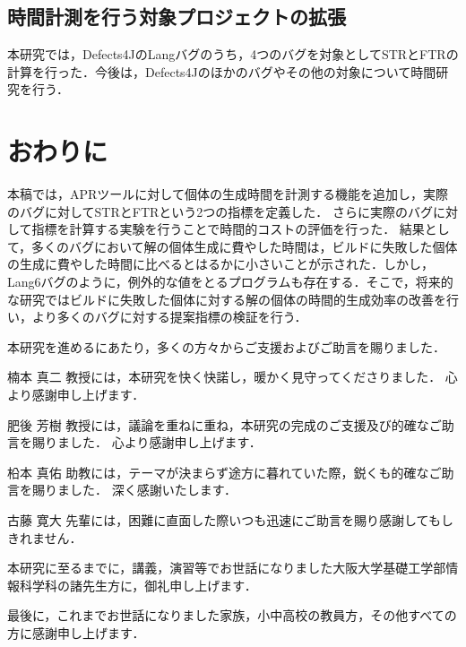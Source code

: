 \documentclass[uplatex,dvipdfmx,a4paper]{jsarticle}
\begin{document}
\subsection{時間計測を行う対象プロジェクトの拡張}
本研究では，Defects4JのLangバグのうち，4つのバグを対象としてSTRとFTRの計算を行った．今後は，Defects4Jのほかのバグやその他の対象について時間研究を行う．
\clearpage
\section{おわりに}\label{sec:concl}
本稿では，APRツールに対して個体の生成時間を計測する機能を追加し，実際のバグに対してSTRとFTRという2つの指標を定義した．
さらに実際のバグに対して指標を計算する実験を行うことで時間的コストの評価を行った．
結果として，多くのバグにおいて解の個体生成に費やした時間は，ビルドに失敗した個体の生成に費やした時間に比べるとはるかに小さいことが示された．しかし，Lang6バグのように，例外的な値をとるプログラムも存在する．そこで，将来的な研究ではビルドに失敗した個体に対する解の個体の時間的生成効率の改善を行い，より多くのバグに対する提案指標の検証を行う．
\clearpage
\acknowledgement

本研究を進めるにあたり，多くの方々からご支援およびご助言を賜りました．

楠本 真二 教授には，本研究を快く快諾し，暖かく見守ってくださりました．
心より感謝申し上げます．

肥後 芳樹 教授には，議論を重ねに重ね，本研究の完成のご支援及び的確なご助言を賜りました．
心より感謝申し上げます．

柗本 真佑 助教には，テーマが決まらず途方に暮れていた際，鋭くも的確なご助言を賜りました．
深く感謝いたします．

古藤 寛大 先輩には，困難に直面した際いつも迅速にご助言を賜り感謝してもしきれません．

本研究に至るまでに，講義，演習等でお世話になりました大阪大学基礎工学部情報科学科の諸先生方に，御礼申し上げます．

最後に，これまでお世話になりました家族，小中高校の教員方，その他すべての方に感謝申し上げます．
\clearpage


\end{document}
